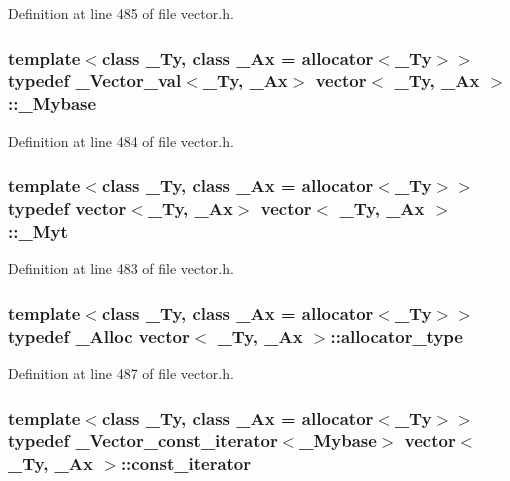Definition at line 485 of file vector.\+h.

\hypertarget{classvector_a1d0fa35df9c0b874ea870eae971fe5e0}{
\subsubsection[{\+\_\+\+Mybase}]{\setlength{\rightskip}{0pt plus 5cm}template$<$class \+\_\+\+Ty, class \+\_\+\+Ax = allocator$<$\+\_\+\+Ty$>$$>$ typedef {\bf \+\_\+\+Vector\+\_\+val}$<$\+\_\+\+Ty, \+\_\+\+Ax$>$ {\bf vector}$<$ \+\_\+\+Ty, \+\_\+\+Ax $>$\+::{\bf \+\_\+\+Mybase}}}\label{classvector_a1d0fa35df9c0b874ea870eae971fe5e0}


Definition at line 484 of file vector.\+h.

\hypertarget{classvector_ae499c665535254a7364e3a219b780112}{
\subsubsection[{\+\_\+\+Myt}]{\setlength{\rightskip}{0pt plus 5cm}template$<$class \+\_\+\+Ty, class \+\_\+\+Ax = allocator$<$\+\_\+\+Ty$>$$>$ typedef {\bf vector}$<$\+\_\+\+Ty, \+\_\+\+Ax$>$ {\bf vector}$<$ \+\_\+\+Ty, \+\_\+\+Ax $>$\+::{\bf \+\_\+\+Myt}}}\label{classvector_ae499c665535254a7364e3a219b780112}


Definition at line 483 of file vector.\+h.

\hypertarget{classvector_ae35ea7650735172fd02fdd94aa530a25}{
\subsubsection[{allocator\+\_\+type}]{\setlength{\rightskip}{0pt plus 5cm}template$<$class \+\_\+\+Ty, class \+\_\+\+Ax = allocator$<$\+\_\+\+Ty$>$$>$ typedef {\bf \+\_\+\+Alloc} {\bf vector}$<$ \+\_\+\+Ty, \+\_\+\+Ax $>$\+::{\bf allocator\+\_\+type}}}\label{classvector_ae35ea7650735172fd02fdd94aa530a25}


Definition at line 487 of file vector.\+h.

\hypertarget{classvector_abed2910558c61a5a17113b2d250994da}{
\subsubsection[{const\+\_\+iterator}]{\setlength{\rightskip}{0pt plus 5cm}template$<$class \+\_\+\+Ty, class \+\_\+\+Ax = allocator$<$\+\_\+\+Ty$>$$>$ typedef {\bf \+\_\+\+Vector\+\_\+const\+\_\+iterator}$<${\bf \+\_\+\+Mybase}$>$ {\bf vector}$<$ \+\_\+\+Ty, \+\_\+\+Ax $>$\+::{\bf const\+\_\+iterator}}}\label{classvector_abed2910558c61a5a17113b2d250994da}



